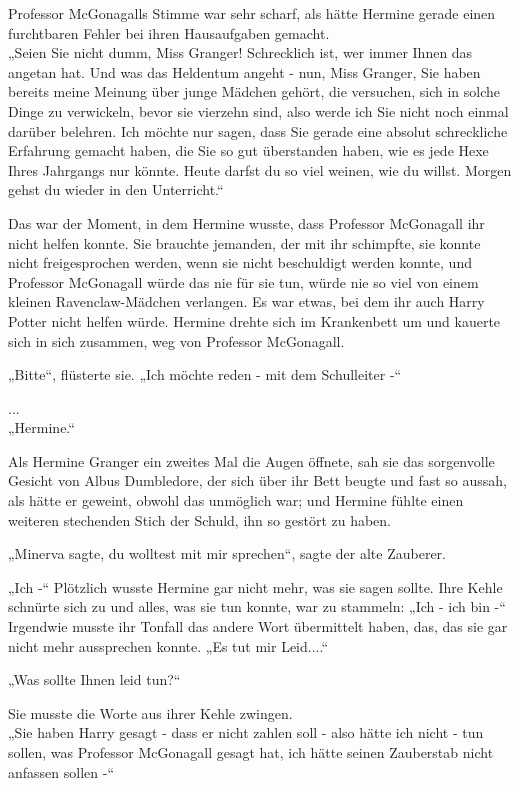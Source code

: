 {Professor McGonagalls Stimme war sehr scharf, als hätte Hermine gerade einen furchtbaren Fehler bei ihren Hausaufgaben gemacht.\\ „Seien Sie nicht dumm, Miss Granger! Schrecklich ist, wer immer Ihnen das angetan hat. Und was das Heldentum angeht - nun, Miss Granger, Sie haben bereits meine Meinung über junge Mädchen gehört, die versuchen, sich in solche Dinge zu verwickeln, bevor sie vierzehn sind, also werde ich Sie nicht noch einmal darüber belehren. Ich möchte nur sagen, dass Sie gerade eine absolut schreckliche Erfahrung gemacht haben, die Sie so gut überstanden haben, wie es jede Hexe Ihres Jahrgangs nur könnte. Heute darfst du so viel weinen, wie du willst. Morgen gehst du wieder in den Unterricht.“

Das war der Moment, in dem Hermine wusste, dass Professor McGonagall ihr nicht helfen konnte. Sie brauchte jemanden, der mit ihr schimpfte, sie konnte nicht freigesprochen werden, wenn sie nicht beschuldigt werden konnte, und Professor McGonagall würde das nie für sie tun, würde nie so viel von einem kleinen Ravenclaw-Mädchen verlangen. Es war etwas, bei dem ihr auch Harry Potter nicht helfen würde. Hermine drehte sich im Krankenbett um und kauerte sich in sich zusammen, weg von Professor McGonagall.

„Bitte“, flüsterte sie. „Ich möchte reden - mit dem Schulleiter -“

...\\ „Hermine.“

Als Hermine Granger ein zweites Mal die Augen öffnete, sah sie das sorgenvolle Gesicht von Albus Dumbledore, der sich über ihr Bett beugte und fast so aussah, als hätte er geweint, obwohl das unmöglich war; und Hermine fühlte einen weiteren stechenden Stich der Schuld, ihn so gestört zu haben.

„Minerva sagte, du wolltest mit mir sprechen“, sagte der alte Zauberer.

„Ich -“ Plötzlich wusste Hermine gar nicht mehr, was sie sagen sollte. Ihre Kehle schnürte sich zu und alles, was sie tun konnte, war zu stammeln: „Ich - ich bin -“ Irgendwie musste ihr Tonfall das andere Wort übermittelt haben, das, das sie gar nicht mehr aussprechen konnte. „Es tut mir Leid....“

„Was sollte Ihnen leid tun?“

Sie musste die Worte aus ihrer Kehle zwingen.\\ „Sie haben Harry gesagt - dass er nicht zahlen soll - also hätte ich nicht - tun sollen, was Professor McGonagall gesagt hat, ich hätte seinen Zauberstab nicht anfassen sollen -“

}
